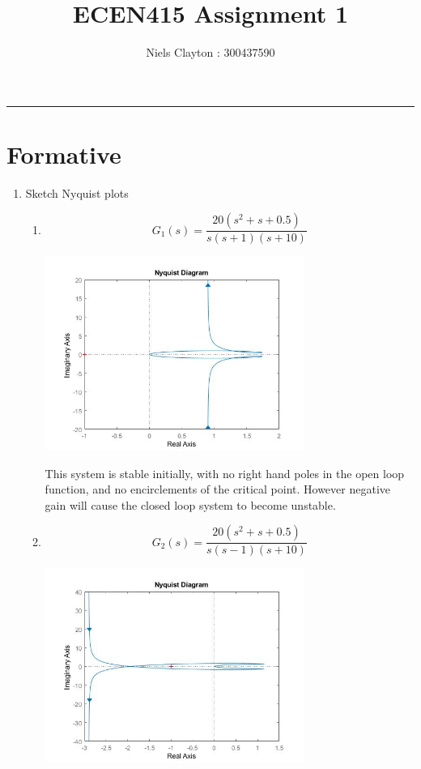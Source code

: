 \documentclass[a4paper,11pt]{article}
\begin{document}
\begin{preview}
\title{\LARGE{\textbf{ECEN415 Assignment 1}}}
\author{Niels Clayton : 300437590}
\date{}
\maketitle
\hrule

\section*{Formative}

\begin{enumerate}
    
    \item Sketch Nyquist plots

    \begin{enumerate}
      \item $$ G_1 (s) = \frac{20(s^2+s+0.5)}{s(s+1)(s+10)} $$
      
      \begin{center}
        \includegraphics[width=0.7\textwidth]{A_1/1_a.jpg}
      \end{center}

      This system is stable initially, with no right hand poles in the open loop function, and no encirclements of the critical point. However negative gain will cause the closed loop system to become unstable.\\
      

      \item $$ G_2 (s) = \frac{20(s^2+s+0.5)}{s(s-1)(s+10)} $$

      \begin{center}
        \includegraphics[width=0.7\textwidth]{A_1/1_b.jpg}
      \end{center}


\end{enumerate}
\end{enumerate}
\end{preview}
\end{document}
